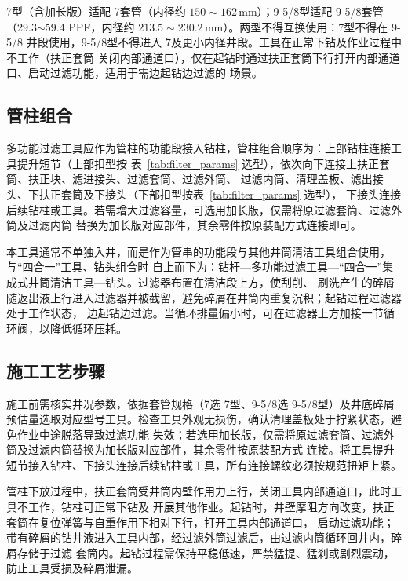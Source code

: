 7\inch 型（含加长版）适配 7\inch 套管（内径约 $150\sim162$\,mm）；9-5/8\inch 型适配 9-5/8\inch 套管
（29.3$\sim$59.4 PPF，内径约 $213.5\sim230.2$\,mm）。两型不得互换使用：7\inch 型不得在 9-5/8\inch
井段使用，9-5/8\inch 型不得进入 7\inch 及更小内径井段。工具在正常下钻及作业过程中不工作（扶正套筒
关闭内部通道口），仅在起钻时通过扶正套筒下行打开内部通道口、启动过滤功能，适用于需边起钻边过滤的
场景。

\subsection{管柱组合}

多功能过滤工具应作为管柱的功能段接入钻柱，管柱组合顺序为：上部钻柱连接工具提升短节（上部扣型按
表~\ref{tab:filter_params} 选型），依次向下连接上扶正套筒、扶正块、滤进接头、过滤套筒、过滤外筒、
过滤内筒、清理盖板、滤出接头、下扶正套筒及下接头（下部扣型按表~\ref{tab:filter_params} 选型），
下接头连接后续钻柱或工具。若需增大过滤容量，可选用加长版，仅需将原过滤套筒、过滤外筒及过滤内筒
替换为加长版对应部件，其余零件按原装配方式连接即可。

本工具通常不单独入井，而是作为管串的功能段与其他井筒清洁工具组合使用，与“四合一”工具、钻头组合时
自上而下为：钻杆—多功能过滤工具—“四合一”集成式井筒清洁工具—钻头。过滤器布置在清洁段上方，使刮削、
刷洗产生的碎屑随返出液上行进入过滤器并被截留，避免碎屑在井筒内重复沉积；起钻过程过滤器处于工作状态，
边起钻边过滤。当循环排量偏小时，可在过滤器上方加接一节循环阀，以降低循环压耗。

\subsection{施工工艺步骤}

施工前需核实井况参数，依据套管规格（7\inch 选 7\inch 型、9-5/8\inch 选 9-5/8\inch 型）及井底碎屑
预估量选取对应型号工具。检查工具外观无损伤，确认清理盖板处于拧紧状态，避免作业中途脱落导致过滤功能
失效；若选用加长版，仅需将原过滤套筒、过滤外筒及过滤内筒替换为加长版对应部件，其余零件按原装配方式
连接。将工具提升短节接入钻柱、下接头连接后续钻柱或工具，所有连接螺纹必须按规范扭矩上紧。

管柱下放过程中，扶正套筒受井筒内壁作用力上行，关闭工具内部通道口，此时工具不工作，钻柱可正常下钻及
开展其他作业。起钻时，井壁摩阻方向改变，扶正套筒在复位弹簧与自重作用下相对下行，打开工具内部通道口，
启动过滤功能；带有碎屑的钻井液进入工具内部，经过滤外筒过滤后，由过滤内筒循环回井内，碎屑存储于过滤
套筒内。起钻过程需保持平稳低速，严禁猛提、猛刹或剧烈震动，防止工具受损及碎屑泄漏。

